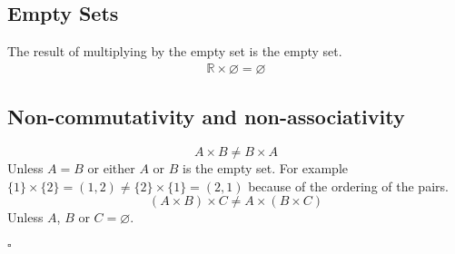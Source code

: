\documentclass[a4paper]{article}
\begin{document}
\subsection{Empty Sets}
The result of multiplying by the empty set is the empty set.
\begin{align}
  \mathbb{R} \times \varnothing = \varnothing
\end{align}
\subsection{Non-commutativity and non-associativity}
\begin{equation}
  A \times B \neq B \times A
\end{equation}
Unless $A=B$ or either $A$ or $B$ is the empty set. For example $\{1\} \times \{2\} = (1,2) \neq \{2\} \times \{1\} = (2,1)$ because of the ordering of the pairs. 
\begin{equation}
  (A \times B) \times C \neq A \times (B \times C)
\end{equation}
Unless $A$, $B$ or $C =\varnothing$.\\ \\
$\square$
\end{document}
